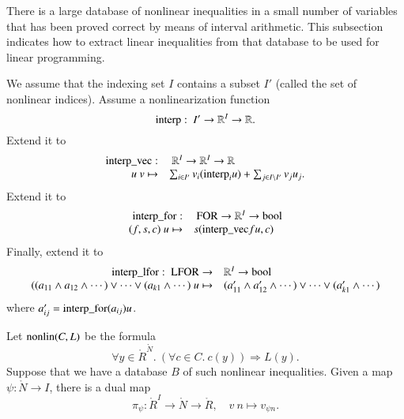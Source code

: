 There is a large database of nonlinear inequalities in a small
number of variables that has been proved correct by means of
interval arithmetic.  This subsection indicates how to extract
linear inequalities from that database to be used for linear
programming.


We assume that the indexing set $I$ contains a subset $I'$ (called
the set of nonlinear indices). Assume a nonlinearization function
    $$
    {\operatorname{interp}}:\ I' \to \mathbb{R}^{I} \to \mathbb{R}.
    $$
Extend it to
    $$
    \begin{array}{rll}
    {\operatorname{interp\_vec}}:&\ \mathbb{R}^{I} \to \mathbb{R}^I \to
    \mathbb{R}\\
    u\ v \mapsto& \sum_{i\in I'} v_i ({\operatorname{interp}}_i u) +
        \sum_{j\in I\setminus I'} v_j u_j.
    \end{array}
    $$
Extend it to
    $$
    \begin{array}{rll}
    {\operatorname{interp\_for}}:&\ {\operatorname{FOR}}\to\mathbb{R}^I\to\operatorname{bool}\\
    (f,s,c)\ u\mapsto& s({\operatorname{interp\_vec}} f u,c)\\
    \end{array}
    $$
Finally, extend it to
    $$
    \begin{array}{rll}
    {\operatorname{interp\_lfor}}:\ {\operatorname{LFOR}}\to&\mathbb{R}^I\to\operatorname{bool}\\
    ((a_{11}\wedge a_{12}\wedge\cdots) \vee \cdots \vee (a_{k1}\wedge
    \cdots)\ u\mapsto& (a'_{11}\wedge a'_{12}\wedge\cdots) \vee \cdots \vee (a'_{k1}\wedge
    \cdots)\\
    \end{array}
    $$
where $a'_{ij} = {\operatorname{interp\_for}} (a_{ij}) u$.


Let ${\operatorname{nonlin}}(C,L)$ be the formula
    $$
    \forall y\in\ring{R}^\ring{N}.\ (\forall c\in C.\
    c(y)) \Rightarrow L(y).
    $$
Suppose that we have a database $B$ of such nonlinear
inequalities.  Given a map $\psi:\ring{N}\to I$, there is a dual
map
    $$
    \pi_\psi: \ring{R}^I \to \ring{N}\to \ring{R},\quad v\ n\mapsto
    v_{\psi n}.
    $$


